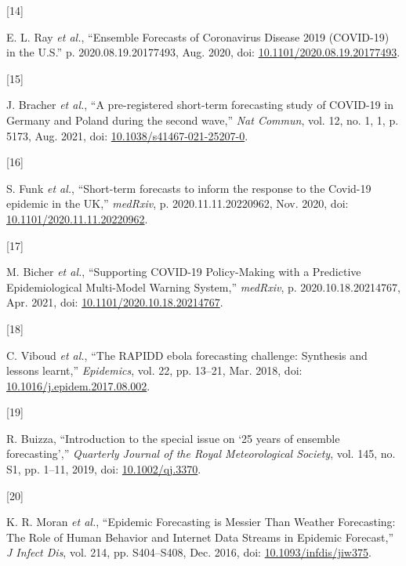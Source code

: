 \documentclass[
]{article}
\newlength{\cslhangindent}
\newlength{\csllabelwidth}
\newlength{\cslentryspacingunit} %
\newenvironment{CSLReferences}[2] %
 {%
  \setlength{\parindent}{0pt}
  \ifodd #1
  \let\oldpar\par
  \def\par{\hangindent=\cslhangindent\oldpar}
  \fi
  \setlength{\parskip}{#2\cslentryspacingunit}
 }%
 {}
\newcommand{\CSLLeftMargin}[1]{\parbox[t]{\csllabelwidth}{#1}}
\newcommand{\CSLRightInline}[1]{\parbox[t]{\linewidth - \csllabelwidth}{#1}\break}
\begin{document}
\begin{CSLReferences}{0}{0}
\leavevmode{}%
\CSLLeftMargin{{[}14{]} }
\CSLRightInline{E. L. Ray \emph{et al.}, {``Ensemble {Forecasts} of {Coronavirus Disease} 2019 ({COVID-19}) in the {U}.{S}.''} p. 2020.08.19.20177493, Aug. 2020, doi: \href{https://doi.org/10.1101/2020.08.19.20177493}{10.1101/2020.08.19.20177493}.}

\leavevmode{}%
\CSLLeftMargin{{[}15{]} }
\CSLRightInline{J. Bracher \emph{et al.}, {``A pre-registered short-term forecasting study of {COVID-19} in {Germany} and {Poland} during the second wave,''} \emph{Nat Commun}, vol. 12, no. 1, 1, p. 5173, Aug. 2021, doi: \href{https://doi.org/10.1038/s41467-021-25207-0}{10.1038/s41467-021-25207-0}.}

\leavevmode{}%
\CSLLeftMargin{{[}16{]} }
\CSLRightInline{S. Funk \emph{et al.}, {``Short-term forecasts to inform the response to the {Covid-19} epidemic in the {UK},''} \emph{medRxiv}, p. 2020.11.11.20220962, Nov. 2020, doi: \href{https://doi.org/10.1101/2020.11.11.20220962}{10.1101/2020.11.11.20220962}.}

\leavevmode{}%
\CSLLeftMargin{{[}17{]} }
\CSLRightInline{M. Bicher \emph{et al.}, {``Supporting {COVID-19 Policy-Making} with a {Predictive Epidemiological Multi-Model Warning System},''} \emph{medRxiv}, p. 2020.10.18.20214767, Apr. 2021, doi: \href{https://doi.org/10.1101/2020.10.18.20214767}{10.1101/2020.10.18.20214767}.}

\leavevmode{}%
\CSLLeftMargin{{[}18{]} }
\CSLRightInline{C. Viboud \emph{et al.}, {``The {RAPIDD} ebola forecasting challenge: {Synthesis} and lessons learnt,''} \emph{Epidemics}, vol. 22, pp. 13--21, Mar. 2018, doi: \href{https://doi.org/10.1016/j.epidem.2017.08.002}{10.1016/j.epidem.2017.08.002}.}

\leavevmode{}%
\CSLLeftMargin{{[}19{]} }
\CSLRightInline{R. Buizza, {``Introduction to the special issue on {`25 years of ensemble forecasting'},''} \emph{Quarterly Journal of the Royal Meteorological Society}, vol. 145, no. S1, pp. 1--11, 2019, doi: \href{https://doi.org/10.1002/qj.3370}{10.1002/qj.3370}.}

\leavevmode{}%
\CSLLeftMargin{{[}20{]} }
\CSLRightInline{K. R. Moran \emph{et al.}, {``Epidemic {Forecasting} is {Messier Than Weather Forecasting}: {The Role} of {Human Behavior} and {Internet Data Streams} in {Epidemic Forecast},''} \emph{J Infect Dis}, vol. 214, pp. S404--S408, Dec. 2016, doi: \href{https://doi.org/10.1093/infdis/jiw375}{10.1093/infdis/jiw375}.}


\end{CSLReferences}
\end{document}
